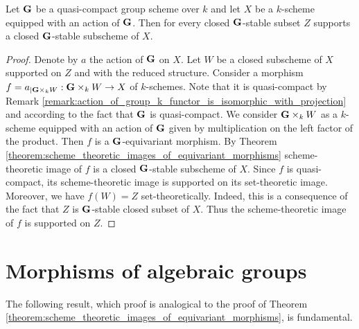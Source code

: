 \begin{corollary}\label{corollary:every_closed_stable_subset_supports_closed_stable_subscheme}
Let $\mathbf{G}$ be a quasi-compact group scheme over $k$ and let $X$ be a $k$-scheme equipped with an action of $\mathbf{G}$. Then for every closed $\mathbf{G}$-stable subset $Z$ supports a closed $\mathbf{G}$-stable subscheme of $X$.
\end{corollary}
\begin{proof}
Denote by $a$ the action of $\mathbf{G}$ on $X$. Let $W$ be a closed subscheme of $X$ supported on $Z$ and with the reduced structure. Consider a morphism $f = a_{\mid \mathbf{G}\times_k W}:\mathbf{G}\times_k W\rightarrow X$ of $k$-schemes. Note that it is quasi-compact by Remark \ref{remark:action_of_group_k_functor_is_isomorphic_with_projection} and according to the fact that $\mathbf{G}$ is quasi-compact. We consider $\mathbf{G}\times_k W$ as a $k$-scheme equipped with an action of $\mathbf{G}$ given by multiplication on the left factor of the product. Then $f$ is a $\mathbf{G}$-equivariant morphism. By Theorem \ref{theorem:scheme_theoretic_images_of_equivariant_morphisms} scheme-theoretic image of $f$ is a closed $\mathbf{G}$-stable subscheme of $X$. Since $f$ is quasi-compact, its scheme-theoretic image is supported on its set-theoretic image. Moreover, we have $f(W) = Z$ set-theoretically. Indeed, this is a consequence of the fact that $Z$ is $\mathbf{G}$-stable closed subset of $X$. Thus the scheme-theoretic image of $f$ is supported on $Z$.
\end{proof}

\section{Morphisms of algebraic groups}
\noindent
The following result, which proof is analogical to the proof of Theorem \ref{theorem:scheme_theoretic_images_of_equivariant_morphisms}, is fundamental.

